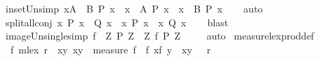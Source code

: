 \begin{isabellebody}
\ in{\isacharunderscore}set{\isacharunderscore}Un{\isacharunderscore}simp{\isacharcolon}\ {\isachardoublequoteopen}{\isacharparenleft}{\isasymforall}x{\isasymin}A\ {\isasymunion}\ B{\isachardot}\ P\ x{\isacharparenright}\ {\isacharequal}\ {\isacharparenleft}{\isacharparenleft}{\isasymforall}x\ {\isasymin}\ A{\isachardot}\ P\ x{\isacharparenright}\ {\isasymand}\ {\isacharparenleft}{\isasymforall}x\ {\isasymin}\ B{\isachardot}\ P\ x{\isacharparenright}{\isacharparenright}{\isachardoublequoteclose}\isanewline
%
\isadelimproof
\ \ %
\endisadelimproof
%
\isatagproof
{}\isamarkupfalse%
\ auto%
\endisatagproof
{\isafoldproof}%
%
\isadelimproof
\isanewline
%
\endisadelimproof
\isanewline
{}\isamarkupfalse%
\ split{\isacharunderscore}all{\isacharunderscore}conj{\isacharcolon}\ {\isachardoublequoteopen}{\isacharparenleft}{\isasymforall}x{\isachardot}\ P\ x\ {\isasymand}\ Q\ x{\isacharparenright}\ {\isacharequal}\ {\isacharparenleft}{\isacharparenleft}{\isasymforall}x{\isachardot}\ P\ x{\isacharparenright}\ {\isasymand}\ {\isacharparenleft}{\isasymforall}x{\isachardot}\ Q\ x{\isacharparenright}{\isacharparenright}{\isachardoublequoteclose}\isanewline
%
\isadelimproof
\ \ %
\endisadelimproof
%
\isatagproof
{}\isamarkupfalse%
\ blast%
\endisatagproof
{\isafoldproof}%
%
\isadelimproof
\isanewline
%
\endisadelimproof
\isanewline
{}\isamarkupfalse%
\ image{\isacharunderscore}Un{\isacharunderscore}single{\isacharunderscore}simp{\isacharcolon}\ {\isachardoublequoteopen}f\ {\isacharbackquote}\ {\isacharparenleft}{\isasymUnion}Z{\isachardot}\ {\isacharbraceleft}P\ Z{\isacharbraceright}{\isacharparenright}\ {\isacharequal}\ {\isacharparenleft}{\isasymUnion}Z{\isachardot}\ {\isacharbraceleft}f\ {\isacharparenleft}P\ Z{\isacharparenright}{\isacharbraceright}{\isacharparenright}\ {\isachardoublequoteclose}\isanewline
%
\isadelimproof
\ \ %
\endisadelimproof
%
\isatagproof
{}\isamarkupfalse%
\ auto%
\endisatagproof
{\isafoldproof}%
%
\isadelimproof
\isanewline
%
\endisadelimproof
\isanewline
\isanewline
\isanewline
{}\isamarkupfalse%
\ measure{\isacharunderscore}lex{\isacharunderscore}prod{\isacharunderscore}def{\isacharprime}{\isacharcolon}\ \isanewline
\ \ {\isachardoublequoteopen}f\ {\isacharless}{\isacharasterisk}mlex{\isacharasterisk}{\isachargreater}\ r\ {\isasymequiv}\ {\isacharparenleft}{\isacharbraceleft}{\isacharparenleft}x{\isacharcomma}y{\isacharparenright}{\isachardot}\ {\isacharparenleft}x{\isacharcomma}y{\isacharparenright}\ {\isasymin}\ measure\ f\ {\isasymor}\ f\ x{\isacharequal}f\ y\ {\isasymand}\ {\isacharparenleft}x{\isacharcomma}y{\isacharparenright}\ {\isasymin}\ \ r{\isacharbraceright}{\isacharparenright}{\isachardoublequoteclose}\isanewline

\end{isabellebody}
